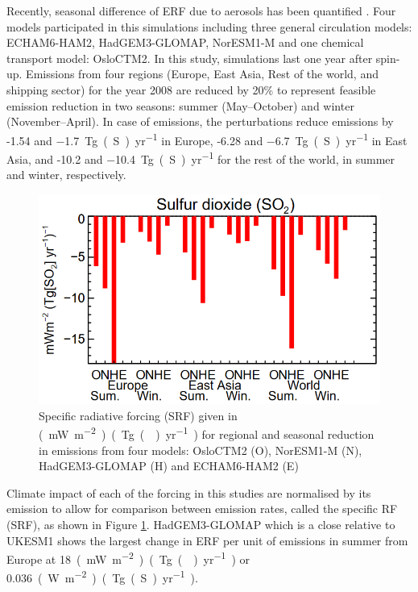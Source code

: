 Recently, seasonal difference of ERF due to aerosols has been quantified \citep{bellouinRegionalSeasonalRadiative2016}. Four models participated in this simulations including three general circulation models: ECHAM6-HAM2, HadGEM3-GLOMAP, NorESM1-M  and one chemical transport model: OsloCTM2. In this study, simulations last one year after spin-up. Emissions from four regions (Europe, East Asia, Rest of the world, and shipping sector) for the year 2008 are reduced by 20\%  to represent feasible emission reduction in two seasons: summer (May--October) and winter (November--April). In case of  emissions, the perturbations reduce  emissions by -1.54 and \qty{-1.7}{Tg(S)~yr^{-1}} in Europe, -6.28 and \qty{-6.7}{Tg(S)~yr^{-1}} in East Asia, and -10.2 and \qty{-10.4}{Tg(S)~yr^{-1}} for the rest of the world, in summer and winter, respectively.


\begin{figure}
    \centering
    \includegraphics[width=0.5\linewidth]{Chapter4/Figs/bellouin2016.png}
    \caption{ Specific radiative forcing (SRF) given in \unit{(mW~m^{-2})~(Tg()~yr^{-1})} for regional and seasonal reduction in  emissions from four models:  OsloCTM2 (O), NorESM1-M (N), HadGEM3-GLOMAP (H) and ECHAM6-HAM2 (E) \cite{bellouinRegionalSeasonalRadiative2016}}
    \label{fig:ch4:bellouin2016}
\end{figure}

Climate impact of each of the forcing in this studies are normalised by its emission to allow for comparison between emission rates, called the specific RF (SRF), as shown in Figure \ref{fig:ch4:bellouin2016}. HadGEM3-GLOMAP  which is a close relative to UKESM1 shows the largest change in ERF per unit of  emissions in summer from Europe at \qty{18}{(mW~m^{-2})~(Tg()~yr^{-1})} or \qty{0.036}{(W~m^{-2})~(Tg(S)~yr^{-1})}.

